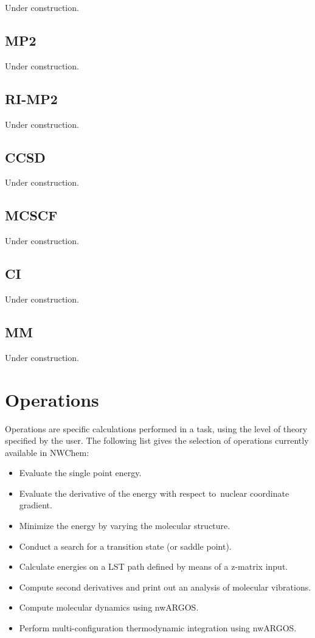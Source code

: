 Under construction.

\subsection{MP2}

Under construction.

\subsection{RI-MP2}

Under construction.

\subsection{CCSD}

Under construction.

\subsection{MCSCF}

Under construction.

\subsection{CI}

Under construction.

\subsection{MM}

Under construction.



\section{Operations}

Operations are specific calculations performed in a task, using the level of
theory specified by the user.  
The following list gives the selection of operations currently
available in NWChem:
\begin{itemize}
\item Evaluate the single point energy.
\item Evaluate the derivative of the energy with respect to\
   nuclear coordinate gradient.
\item Minimize the energy by varying the molecular
   structure.
\item Conduct a search for a transition state (or saddle point). 
\item Calculate energies on a LST path defined by means of
a z-matrix input.
\item Compute second derivatives 
and print out an analysis of molecular vibrations.
\item Compute molecular dynamics using nwARGOS.
\item Perform multi-con\-fig\-ura\-tion
  thermo\-dynamic integ\-ration using nwARGOS.
\end{itemize}


